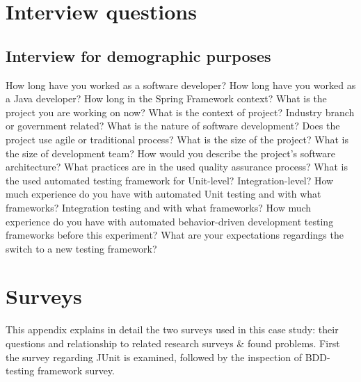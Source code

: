 \chapter{Interview questions}
\label{chapter:interview}
\section{Interview for demographic purposes}
    \label{section:demographic}
    \begin{outline}[enumerate]
    \1 How long have you worked as a software developer?
    \1 How long have you worked as a Java developer?
        \2 How long in the Spring Framework context?
    \1 What is the project you are working on now?
        \2 What is the context of project?
            \3 Industry branch or government related?
            \3 What is the nature of software development?
        \2 Does the project use agile or traditional process?
        \2 What is the size of the project?
        \2 What is the size of development team?
        \2 How would you describe the project's software architecture?
        \2 What practices are in the used quality assurance process?
        \2 What is the used automated testing framework for
            \3 Unit-level?
            \3 Integration-level?
    \1 How much experience do you have with automated
        \2 Unit testing and with what frameworks?
        \2 Integration testing and with what frameworks?
    \1 How much experience do you have with automated behavior-driven development testing frameworks before this experiment?
    \1 What are your expectations regardings the switch to a new testing framework?
    \end{outline}

\chapter{Surveys}
\label{chapter:surveys}
This appendix explains in detail the two surveys used in this case study: their questions and relationship to related
research surveys \& found problems. First the survey regarding JUnit is examined, followed by the inspection of BDD-testing
framework survey.
